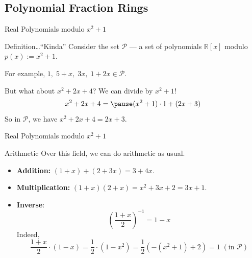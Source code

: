 \documentclass{beamer}
\begin{document}
    \subsection{Polynomial Fraction Rings}
    \begin{frame}{Real Polynomials modulo $x^2+1$}
        \begin{block}{Definition\ldots ``Kinda''}
            Consider the set $\mathcal{P}$ --- a set of polynomials $\mathbb{R}[x]$ modulo $p(x) := x^2+1$.\pause
        \end{block}

        \begin{example}
            For example, $1,\;5+x,\;3x,\;1+2x \in \mathcal{P}$. \pause
            \vspace{7.5px}

            But what about $x^2+2x+4$? We can divide by $x^2+1$!
            \begin{equation*}
                x^2+2x+4 = \pause (x^2+1)\cdot 1 + (2x+3)
            \end{equation*}
            So in $\mathcal{P}$, we have $x^2+2x+4=2x+3$.
        \end{example}
    \end{frame}

    \begin{frame}{Real Polynomials modulo $x^2+1$}
        \begin{block}{Arithmetic}
            Over this field, we can do arithmetic as usual.
            \begin{itemize}
                \item \textbf{Addition:} $(1+x)+(2+3x)=3+4x$.\pause
                \item \textbf{Multiplication:} $(1+x)(2+x)=x^2+3x+2=3x+1$.\pause
                \item \textbf{Inverse}:
                \begin{equation*}
                    \left(\frac{1+x}{2}\right)^{-1} = 1-x
                \end{equation*} 
                \pause Indeed,
                \begin{equation*}
                    \frac{1+x}{2} \cdot (1-x) = \frac{1}{2}\cdot (1-x^2) = \frac{1}{2}\left(-(x^2+1) + 2\right) = 1 \; (\text{in $\mathcal{P}$})
                \end{equation*}
            \end{itemize}
        \end{block}
    \end{frame}
\end{document}

